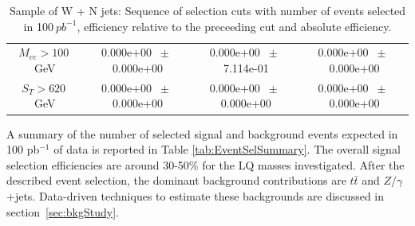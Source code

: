 \begin{table}[htbp]
\begin{center}
\begin{tabular}{|c|c|c|c|}
          $M_{ee}>100~$GeV          &           0.000e+00          $~\pm~$          0.000e+00           &           0.000e+00          $~\pm~$          7.114e-01           &           0.000e+00
         $~\pm~$          0.000e+00          \\
          $ S_T>620~$GeV           &           0.000e+00          $~\pm~$          0.000e+00           &           0.000e+00          $~\pm~$          0.000e+00           &           0.000e+00
        $~\pm~$          0.000e+00          \\
          \hline\hline
\end{tabular}
\end{center}
\caption{Sample of W + N jets: Sequence of selection cuts with number of events selected in 100$~pb^{-1}$, efficiency relative to the preceeding cut and absolute efficiency.}
\label{tab:effic-W}
\end{table}



A summary of the number of selected signal and background events expected in 100 pb$^{-1}$ of data 
is reported in Table \ref{tab:EventSelSummary}. 
The overall signal selection efficiencies are around 30-50\% for the LQ masses investigated. 
After the described event selection, the dominant background contributions 
are $t\bar{t}$ and $Z/\gamma$+jets. Data-driven techniques to estimate these backgrounds
are discussed in section~\ref{sec:bkgStudy}.

